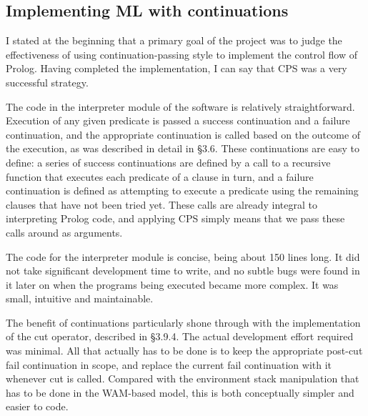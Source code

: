 \documentclass[12pt]{article}
\begin{document}



\subsection{Implementing ML with continuations}

I stated at the beginning that a primary goal of the project was to judge the effectiveness of using continuation-passing style to implement the control flow of Prolog. 
Having completed the implementation, I can say that CPS was a very successful strategy.

The code in the interpreter module of the software is relatively straightforward. 
Execution of any given predicate is passed a success continuation and a failure continuation, and the appropriate continuation is called based on the outcome of the execution, as was described in detail in \S3.6. 
These continuations are easy to define: a series of success continuations are defined by a call to a recursive function that executes each predicate of a clause in turn, and a failure continuation is defined as attempting to execute a predicate using the remaining clauses that have not been tried yet. 
These calls are already integral to interpreting Prolog code, and applying CPS simply means that we pass these calls around as arguments.

The code for the interpreter module is concise, being about 150 lines long. 
It did not take significant development time to write, and no subtle bugs were found in it later on when the programs being executed became more complex. 
It was small, intuitive and maintainable.

The benefit of continuations particularly shone through with the implementation of the cut operator, described in \S3.9.4.
The actual development effort required was minimal.
All that actually has to be done is to keep the appropriate post-cut fail continuation in scope, and replace the current fail continuation with it whenever cut is called.
Compared with the environment stack manipulation that has to be done in the WAM-based model, this is both conceptually simpler and easier to code.
\end{document}
